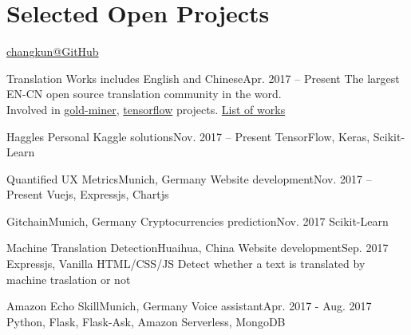 \section{\textbf{Selected Open Projects}}
  \resumeSubHeadingListStart

    {\href{https://github.com/changkun/}{changkun@GitHub}}

    \resumeSubheading
      {Translation Works}{}
      {includes English and Chinese}{Apr. 2017 -- Present}
      \resumeItemListStart
          {The largest EN-CN open source translation community in the word. \\Involved in \href{https://github.com/xitu/gold-miner/}{gold-miner}, \href{https://github.com/xitu/tensorflow}{tensorflow} projects.}
          {\href{https://github.com/changkun/translation}{List of works}}
      \resumeItemListEnd

    \resumeSubheading
      {Haggles}{}
      {Personal Kaggle solutions}{Nov. 2017 -- Present}
      \resumeItemListStart
          {TensorFlow, Keras, Scikit-Learn}
      \resumeItemListEnd

    \resumeSubheading
      {Quantified UX Metrics}{Munich, Germany}
      {Website development}{Nov. 2017 -- Present}
      \resumeItemListStart
          {Vuejs, Expressjs, Chartjs}
      \resumeItemListEnd

    \resumeSubheading
      {Gitchain}{Munich, Germany}
      {Cryptocurrencies prediction}{Nov. 2017}
      \resumeItemListStart
          {Scikit-Learn}
      \resumeItemListEnd

    \resumeSubheading
      {Machine Translation Detection}{Huaihua, China}
      {Website development}{Sep. 2017}
      \resumeItemListStart
          {Expressjs, Vanilla HTML/CSS/JS}
          {Detect whether a text is translated by machine traslation or not}
      \resumeItemListEnd

    \resumeSubheading
      {Amazon Echo Skill}{Munich, Germany}
      {Voice assistant}{Apr. 2017 - Aug. 2017}
      \resumeItemListStart
          {Python, Flask, Flask-Ask, Amazon Serverless, MongoDB}
      \resumeItemListEnd

